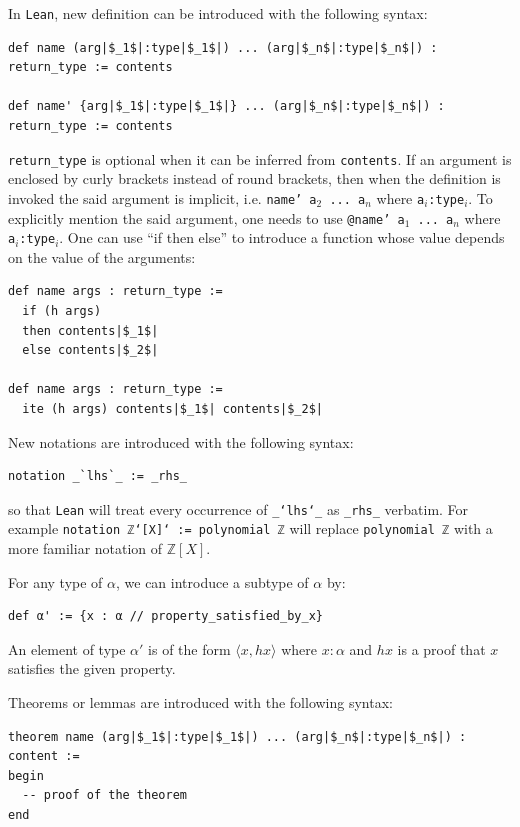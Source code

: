 \documentclass{report}
\theoremstyle{definition}
\begin{document}
In {\tt \small Lean}, new definition can be introduced with the following syntax:
\begin{verbatim}
def name (arg|$_1$|:type|$_1$|) ... (arg|$_n$|:type|$_n$|) : return_type := contents

def name' {arg|$_1$|:type|$_1$|} ... (arg|$_n$|:type|$_n$|) : return_type := contents
\end{verbatim}
{\tt \small return\_type} is optional when it can be inferred from {\tt \small contents}. If an argument is enclosed by curly brackets instead of round brackets, then when the definition is invoked the said argument is implicit, i.e. {\tt \small name' a$_2$ ... a$_n$} where {\tt \small a$_i$:type$_i$}. To explicitly mention the said argument, one needs to use {\tt \small @name' a$_1$ ... a$_n$} where {\tt \small a$_i$:type$_i$}. One can use ``if then else'' to introduce a function whose value depends on the value of the arguments:
\begin{verbatim}
def name args : return_type :=
  if (h args)
  then contents|$_1$|
  else contents|$_2$|

def name args : return_type := 
  ite (h args) contents|$_1$| contents|$_2$|
\end{verbatim}

New notations are introduced with the following syntax:
\begin{verbatim}
notation _`lhs`_ := _rhs_
\end{verbatim}
so that {\tt \small Lean} will treat every occurrence of {\tt \small \_`lhs`\_} as {\tt \small \_rhs\_} verbatim. For example \texttt{notation ℤ`[X]` := polynomial ℤ} will replace {\tt \small polynomial ℤ} with a more familiar notation of $\mathbb{Z}[X]$.

For any type of $\alpha$, we can introduce a subtype of $\alpha$ by:
\begin{verbatim}
def α' := {x : α // property_satisfied_by_x}
\end{verbatim}
An element of type $\alpha'$ is of the form $\langle x, hx\rangle$ where $x:\alpha$ and $hx$ is a proof that $x$ satisfies the given property.

Theorems or lemmas are introduced with the following syntax:
\begin{verbatim}
theorem name (arg|$_1$|:type|$_1$|) ... (arg|$_n$|:type|$_n$|) : content :=
begin
  -- proof of the theorem
end
\end{verbatim}
\end{document}
